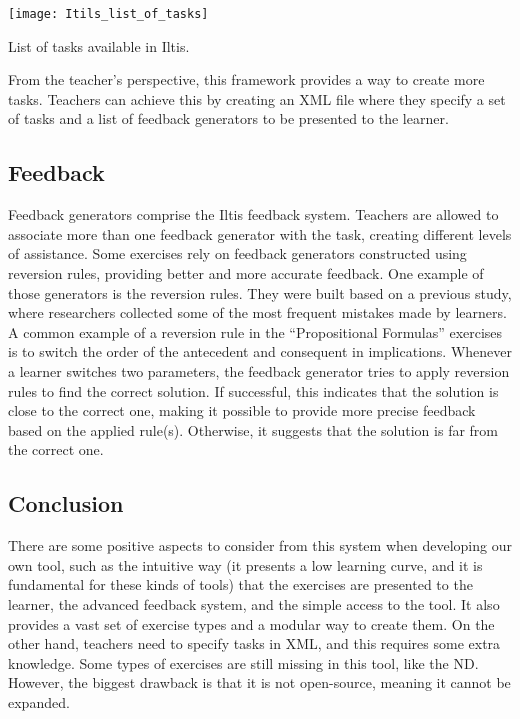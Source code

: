 \begin{table}[htbp]
    \texttt{[image: Itils\_list\_of\_tasks]}
    \caption{List of tasks available in Iltis.}
    \label{img:iltis_tasks}
    \vspace{-10pt}
\end{table}

From the teacher’s perspective, this framework provides a way to create more tasks. Teachers can achieve this by creating an XML file where they specify a set of tasks and a list of feedback generators to be presented to the learner.

\subsection{Feedback}
\label{chap:iltis-feedback}
Feedback generators comprise the Iltis feedback system. Teachers are allowed to associate more than one feedback generator with the task, creating different levels of assistance. Some exercises rely on feedback generators constructed using reversion rules, providing better and more accurate feedback. One example of those generators is the reversion rules. They were built based on a previous study, where researchers collected some of the most frequent mistakes made by learners. A common example of a reversion rule in the “Propositional Formulas” exercises is to switch the order of the antecedent and consequent in implications. Whenever a learner switches two parameters, the feedback generator tries to apply reversion rules to find the correct solution. If successful, this indicates that the solution is close to the correct one, making it possible to provide more precise feedback based on the applied rule(s). Otherwise, it suggests that the solution is far from the correct one.

\subsection{Conclusion}
There are some positive aspects to consider from this system when developing our own tool, such as the intuitive way (it presents a low learning curve, and it is fundamental for these kinds of tools) that the exercises are presented to the learner, the advanced feedback system, and the simple access to the tool. It also provides a vast set of exercise types and a modular way to create them. On the other hand, teachers need to specify tasks in XML, and this requires some extra knowledge. Some types of exercises are still missing in this tool, like the \gls{ND}. However, the biggest drawback is that it is not open-source, meaning it cannot be expanded.

